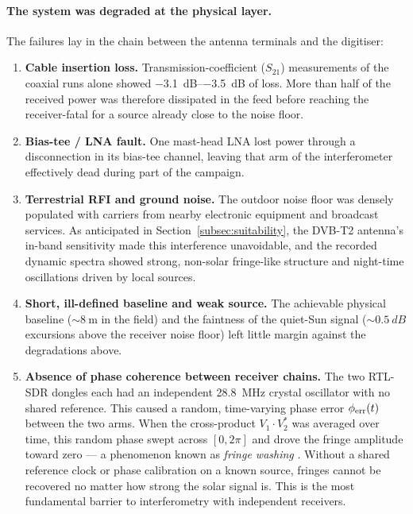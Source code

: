\paragraph{The system was degraded at the physical layer.} The failures lay in
the chain between the antenna terminals and the digitiser:
\begin{enumerate}[leftmargin=1.8em]
    \item \textbf{Cable insertion loss.} Transmission-coefficient ($S_{21}$)
    measurements of the coaxial runs alone showed
    \SIrange{-3.1}{-3.5}{dB} of loss. More than half of the received power was
    therefore dissipated in the feed before reaching the receiver-fatal for a
    source already close to the noise floor.
    \item \textbf{Bias-tee / LNA fault.} One mast-head LNA lost power through a
    disconnection in its bias-tee channel, leaving that arm of the
    interferometer effectively dead during part of the campaign.
    \item \textbf{Terrestrial RFI and ground noise.} The outdoor noise floor was
    densely populated with carriers from nearby electronic equipment and
    broadcast services. As anticipated in Section~\ref{subsec:suitability}, the
    DVB-T2 antenna's in-band sensitivity made this interference unavoidable, and
    the recorded dynamic spectra showed strong, non-solar fringe-like structure
    and night-time oscillations driven by local sources.
    \item \textbf{Short, ill-defined baseline and weak source.} The achievable
    physical baseline ($\sim\!\SI{8}{\metre}$ in the field) and the faintness of
    the quiet-Sun signal ($\sim\!0.5~\si{dB}$ excursions above the receiver noise floor) left little margin
    against the degradations above.
    \item \textbf{Absence of phase coherence between receiver chains.} The
    two RTL-SDR dongles each had an independent \SI{28.8}{\mega\hertz} crystal
    oscillator with no shared reference. This caused a random, time-varying
    phase error $\phi_{\rm err}(t)$ between the two arms. When the
    cross-product $V_1 \cdot V_2^*$ was averaged over time, this random phase
    swept across $[0,2\pi]$ and drove the fringe amplitude toward zero — a
    phenomenon known as \emph{fringe washing} \citep{tms2017}. Without a
    shared reference clock or phase calibration on a known source, fringes
    cannot be recovered no matter how strong the solar signal is. This is the
    most fundamental barrier to interferometry with independent receivers.
\end{enumerate}

